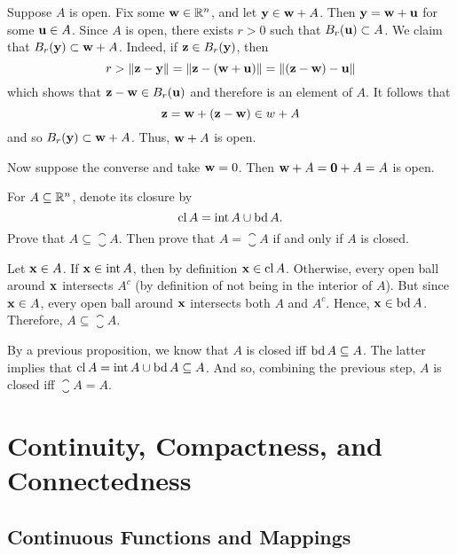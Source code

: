 \documentclass[letterpaper, twoside, 12pt]{book}
\begin{document}
\begin{solution}
    Suppose \(A\) is open. Fix some \(\mathbf w \in \mathbb R^n\),
    and let \(\mathbf y \in \mathbf w + A\). Then 
    \(\mathbf y = \mathbf w + \mathbf u\) for some \(\mathbf u \in A\). 
    Since \(A\) is open, there exists \(r > 0\) such that
    \(B_r(\mathbf u) \subset A\). We claim that 
    \(B_r(\mathbf y) \subset \mathbf w + A\). Indeed, if \(\mathbf z \in B_r(\mathbf y)\),
    then
    \[ r > \| \mathbf z - \mathbf y \| = \| \mathbf z - (\mathbf w + \mathbf u) \| 
    = \| (\mathbf z - \mathbf w) - \mathbf u \| \]
    which shows that \(\mathbf z - \mathbf w \in B_r(\mathbf u)\) and therefore
    is an element of \(A\). It follows that
    \[ \mathbf z = \mathbf w + (\mathbf z - \mathbf w) \in w + A \]
    and so \(B_r(\mathbf y) \subset \mathbf w + A\). Thus, \(\mathbf w + A\) is open.

    Now suppose the converse and take \(\mathbf w = 0\). Then
    \(\mathbf w + A = \mathbf 0 + A = A\) is open.
\end{solution}

\begin{exercise}[12]
  For \(A\subseteq\mathbb R^n\), denote its closure by
  \[
    \operatorname{cl} A = \operatorname{int} A \cup \operatorname{bd} A
  .\]
  Prove that \(A\subseteq \closure A\). Then prove that
  \(A=\closure A\) if and only if \(A\) is closed.
\end{exercise}

\begin{solution}
    Let \(\mathbf x \in A\). If \(\mathbf x \in \operatorname{int} A\),
    then by definition \(\mathbf x \in \operatorname{cl} A\). Otherwise,
    every open ball around \(\mathbf x\) intersects \(A^c\)
    (by definition of not being in the interior of \(A\)). But
    since \(\mathbf x \in A\), every open ball around \(\mathbf x\)
    intersects both \(A\) and \(A^c\). Hence, \(\mathbf x \in \operatorname{bd} A\).
    Therefore, \(A \subseteq \closure A\).

    By a previous proposition, we know that \(A\) is closed iff
    \(\operatorname{bd} A \subseteq A\). The latter implies that
    \(\operatorname{cl} A = \operatorname{int} A \cup \operatorname{bd} A \subseteq A\). 
    And so, combining the previous step, \(A\) is closed iff
    \(\closure A = A \).
\end{solution}


\chapter{Continuity, Compactness, and Connectedness}


\section{Continuous Functions and Mappings}
\end{document}
